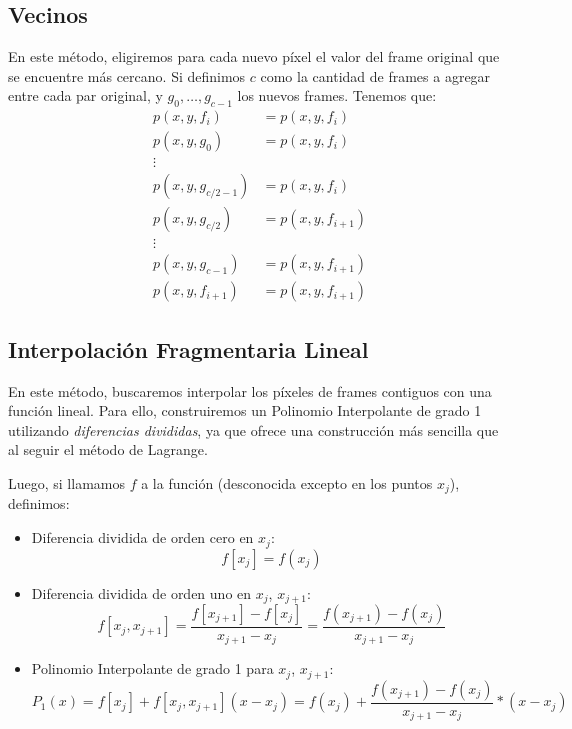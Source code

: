 \subsection{Vecinos}\label{Vecinos}
En este método, eligiremos para cada nuevo píxel el valor del frame original que se encuentre
más cercano.
Si definimos $c$ como la cantidad de frames a agregar entre cada par original, y
$g_0, \dots, g_{c-1}$ los nuevos frames. Tenemos que:
\begin{equation*}
    \begin{aligned}
        p(x,y,f_{i}) &= p(x,y,f_{i})\\
        p(x,y,g_{0}) &= p(x,y,f_{i})\\
        \vdots\\
        p(x,y,g_{c/2-1}) &= p(x,y,f_{i})\\
        p(x,y,g_{c/2}) &= p(x,y,f_{i+1})\\
        \vdots\\
        p(x,y,g_{c-1}) &= p(x,y,f_{i+1})\\
        p(x,y,f_{i+1}) &= p(x,y,f_{i+1})
    \end{aligned}
\end{equation*}

\subsection{Interpolación Fragmentaria Lineal}\label{Lineal}
En este método, buscaremos interpolar los píxeles de frames contiguos con una función
lineal. Para ello, construiremos un Polinomio Interpolante de grado 1 utilizando
\textit{diferencias divididas}, ya que ofrece una construcción más sencilla que al seguir
el método de Lagrange.

Luego, si llamamos $f$ a la función (desconocida excepto en los puntos $x_j$), definimos:
\begin{itemize}
    \item Diferencia dividida de orden cero en $x_j$:
        \begin{equation*}
            f[x_j] = f(x_j)
        \end{equation*}
    \item Diferencia dividida de orden uno en $x_j$, $x_{j+1}$:
        \begin{equation*}
            f[x_j,x_{j+1}]= \frac{f[x_{j+1}] - f[x_j]}{x_{j+1} - x_j} = \frac{f(x_{j+1}) - f(x_j)}{x_{j+1} - x_j}
        \end{equation*}
    \item Polinomio Interpolante de grado 1 para $x_j$, $x_{j+1}$:
        \begin{equation*}
            P_1(x) = f[x_j] + f[x_j,x_{j+1}](x-x_j) = f(x_j) + \frac{f(x_{j+1}) - f(x_j)}{x_{j+1} - x_j}*(x-x_j)
        \end{equation*}
\end{itemize}


